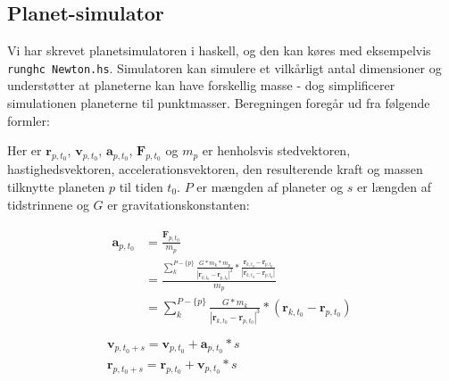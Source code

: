 \subsection{Planet-simulator}
Vi har skrevet planetsimulatoren i haskell, og den kan køres med eksempelvis
{\tt runghc Newton.hs}. Simulatoren kan simulere et vilkårligt antal dimensioner
og understøtter at planeterne kan have forskellig masse - dog simplificerer
simulationen planeterne til punktmasser. Beregningen foregår ud fra følgende
formler:

Her er $\mathbf{r}_{p,t_0}$, $\mathbf{v}_{p,t_0}$, $\mathbf{a}_{p,t_0}$,
$\mathbf{F}_{p,t_0}$ og $m_p$
er henholsvis stedvektoren, hastighedsvektoren, accelerationsvektoren, den
resulterende kraft og massen tilknytte planeten $p$ til
tiden $t_0$. $P$ er mængden af planeter og $s$ er længden af tidstrinnene og $G$
er gravitationskonstanten:

\begin{gather*}
\begin{split}
\mathbf{a}_{p,t_0} &= \frac{\mathbf{F}_{p,t_0}}{m_p}\\
&= \frac{\sum_k^{P - \{p\}} \frac{G*m_k*m_p}{|\mathbf{r}_{k,t_0} - \mathbf{r}_{p,t_0}|^2} *
\frac{\mathbf{r}_{k,t_0} - \mathbf{r}_{p,t_0}}{|\mathbf{r}_{k,t_0} - \mathbf{r}_{p,t_0}|}}{m_p} \\
&= \sum_k^{P - \{p\}} \frac{G*m_k}{|\mathbf{r}_{k,t_0} - \mathbf{r}_{p,t_0}|^3}
* (\mathbf{r}_{k,t_0} - \mathbf{r}_{p,t_0})
\end{split} \\
\\
\mathbf{v}_{p,t_0+s} = \mathbf{v}_{p,t_0} + \mathbf{a}_{p,t_0}*s \\
\mathbf{r}_{p,t_0+s} = \mathbf{r}_{p,t_0} + \mathbf{v}_{p,t_0}*s
\end{gather*}


